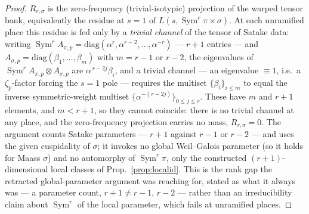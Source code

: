 \documentclass[11pt]{article}
\theoremstyle{definition}
\newcommand{\Sym}{\operatorname{Sym}}
\begin{document}
\begin{proof}
$R_{r,\sigma}$ is the zero-frequency (trivial-isotypic) projection of the warped tensor bank, equivalently
the residue at $s=1$ of $L(s,\Sym^r\pi\times\sigma)$. At each unramified place this residue is fed only by a
\emph{trivial channel} of the tensor of Satake data: writing $\Sym^r A_{\pi,p}=\mathrm{diag}
(\alpha^{r},\alpha^{r-2},\dots,\alpha^{-r})$ --- $r+1$ entries --- and $A_{\sigma,p}=\mathrm{diag}
(\beta_1,\dots,\beta_m)$ with $m=r-1$ or $r-2$, the eigenvalues of $\Sym^r A_{\pi,p}\otimes A_{\sigma,p}$ are
$\alpha^{\,r-2j}\beta_i$, and a trivial channel --- an eigenvalue $\equiv 1$, i.e.\ a $\zeta_p$-factor
forcing the $s=1$ pole --- requires the multiset $\{\beta_i\}_{i\le m}$ to equal the inverse symmetric-weight
multiset $\{\alpha^{-(r-2j)}\}_{0\le j\le r}$. These have $m$ and $r+1$ elements, and $m<r+1$, so they cannot
coincide: there is no trivial channel at any place, and the zero-frequency projection carries no mass,
$R_{r,\sigma}=0$. The argument counts Satake parameters --- $r+1$ against $r-1$ or $r-2$ --- and uses the
given cuspidality of $\sigma$; it invokes no global Weil--Galois parameter (so it holds for Maass $\sigma$)
and no automorphy of $\Sym^r\pi$, only the constructed $(r+1)$-dimensional local classes of
Prop.~\ref{prop:localid}. This is the rank gap the retracted global-parameter argument was reaching for,
stated as what it always was --- a parameter count, $r+1\neq r-1,\,r-2$ --- rather than an irreducibility
claim about $\Sym^r$ of the local parameter, which fails at unramified places.
\end{proof}
\end{document}
